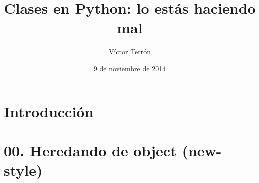\documentclass[14pt]{beamer}
\title{Clases en Python: lo estás haciendo mal}
\author{Víctor Terrón}
\date{9 de noviembre de 2014}
\institute{IAA-CSIC}
\newcommand{\punto}[1]{}
\begin{document}
\section{Introducción}


\section{00. Heredando de object (new-style)}
\punto{00}
\end{document}
